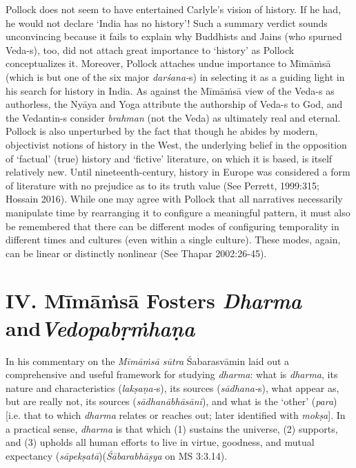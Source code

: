 Pollock does not seem to have entertained Carlyle’s vision of history. If he had, he would not declare ‘India has no history’! Such a summary verdict sounds unconvincing because it fails to explain why Buddhists and Jains (who spurned Veda-s), too, did not attach great importance to ‘history’ as Pollock conceptualizes it. Moreover, Pollock attaches undue importance to Mīmāṁsā (which is but one of the six major \textit{darśana-}s) in selecting it as a guiding light in his search for history in India. As against the Mīmāṁsā view of the Veda-s as authorless, the Nyāya and Yoga attribute the authorship of Veda-s to God, and the Vedantin-s consider \textit{brahman} (not the Veda) as ultimately real and eternal. Pollock is also unperturbed by the fact that though he abides by modern, objectivist notions of history in the West, the underlying belief in the opposition of ‘factual’ (true) history and ‘fictive’ literature, on which it is based, is itself relatively new. Until nineteenth-century, history in Europe was considered a form of literature with no prejudice as to its truth value (See Perrett, 1999:315; Hossain 2016). While one may agree with Pollock that all narratives necessarily manipulate time by rearranging it to configure a meaningful pattern, it must also be remembered that there can be different modes of configuring temporality in different times and cultures (even within a single culture). These modes, again, can be linear or distinctly nonlinear (See Thapar 2002:26-45).


\section*{IV. Mīmāṁsā Fosters \textit{Dharma} and\hfill \break \textit{Vedopabṛṁhaṇa}}

In his commentary on the \textit{Mīmāṁsā sūtra} Śabarasvāmin laid out a comprehensive and useful framework for studying \textit{dharma}: what is \textit{dharma}, its nature and characteristics (\textit{lakṣaṇa-}s), its sources (\textit{sādhana-}s), what appear as, but are really not, its sources (\textit{sādhanābhāsāni}), and what is the ‘other’ (\textit{para}) [i.e. that to which \textit{dharma} relates or reaches out; later identified with \textit{mokṣa}]. In a practical sense, \textit{dharma} is that which (1) sustains the universe, (2) supports, and (3) upholds all human efforts to live in virtue, goodness, and mutual expectancy (\textit{sāpekṣatā})(\textit{Śābarabhāṣya} on MS 3:3.14).

